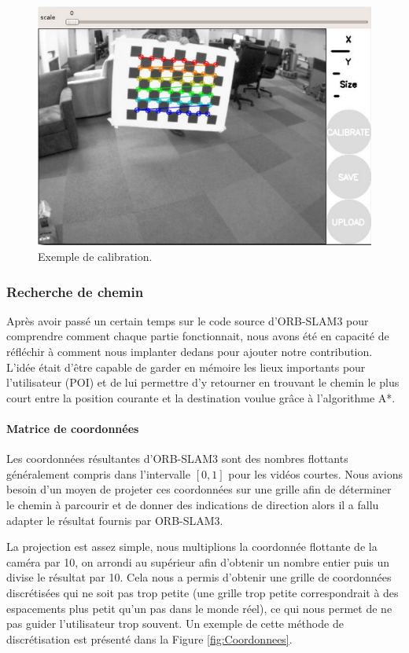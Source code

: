 \documentclass[11pt]{article}
\begin{document}
        \begin{figure}[hbt]  
          \includegraphics[width=\textwidth]{Calibration.png}    
          \caption{Exemple de calibration.}
          \label{fig:Calibration}
        \end{figure}

      \subsubsection{Recherche de chemin}
        Après avoir passé un certain temps sur le code source d'ORB-SLAM3 pour comprendre comment chaque partie fonctionnait, nous avons
        été en capacité de réfléchir à comment nous implanter dedans pour ajouter notre contribution. L'idée était d'être capable de garder
        en mémoire les lieux importants pour l'utilisateur (POI) et de lui permettre d'y retourner en trouvant le chemin le plus court
        entre la position courante et la destination voulue grâce à l'algorithme A*.    

        \paragraph{Matrice de coordonnées}
          Les coordonnées résultantes d'ORB-SLAM3 sont des nombres flottants généralement compris dans l'intervalle $[0,1]$ pour les vidéos
          courtes. Nous avions besoin d'un moyen de projeter ces coordonnées sur une grille afin de déterminer le chemin à parcourir
          et de donner des indications de direction alors il a fallu adapter le résultat fournis par ORB-SLAM3.

         La projection est assez simple, nous multiplions la coordonnée flottante de la caméra par 10, on arrondi au supérieur afin d'obtenir
         un nombre entier puis un divise le résultat par 10. Cela nous a permis d'obtenir une grille de coordonnées discrétisées qui ne soit
         pas trop petite (une grille trop petite correspondrait à des espacements plus petit qu'un pas dans le monde réel), ce qui nous permet
         de ne pas guider l'utilisateur trop souvent. Un exemple de cette méthode de discrétisation est présenté dans la Figure 
         \ref{fig:Coordonnees}.
\end{document}
